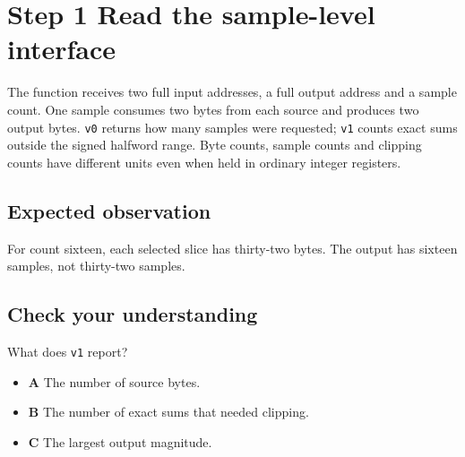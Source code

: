 \section{Step 1 Read the sample-level interface}\label{pcm-s01}

The function receives two full input addresses, a full output address and a sample count. One sample consumes two bytes from each source and produces two output bytes. \texttt{v0} returns how many samples were requested; \texttt{v1} counts exact sums outside the signed halfword range. Byte counts, sample counts and clipping counts have different units even when held in ordinary integer registers.

\subsection{Expected observation}
For count sixteen, each selected slice has thirty-two bytes. The output has sixteen samples, not thirty-two samples.

\subsection{Check your understanding}
What does \texttt{v1} report?

\begin{itemize}
  \item \textbf{A} The number of source bytes.
  \item \textbf{B} The number of exact sums that needed clipping.
  \item \textbf{C} The largest output magnitude.
\end{itemize}
